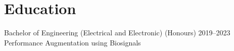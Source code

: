\section{Education}

{Bachelor of Engineering (Electrical and Electronic) (Honours)}
{2019--2023}
{Performance Augmentation using Biosignals}
